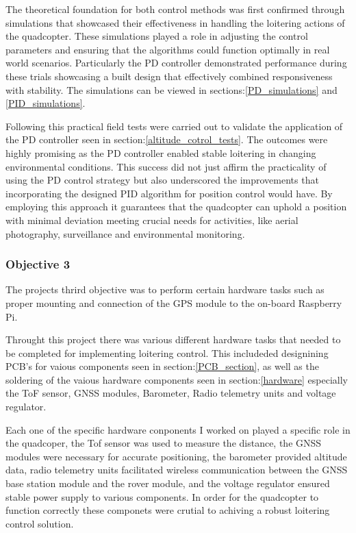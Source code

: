 \documentclass{article}
\begin{document}
The theoretical foundation for both control methods was first confirmed through
simulations that showcased their effectiveness in handling the loitering actions
of the quadcopter. These simulations played a role in adjusting the control
parameters and ensuring that the algorithms could function optimally in real
world scenarios. Particularly the PD controller demonstrated performance during
these trials showcasing a built design that effectively combined responsiveness
with stability. The simulations can be viewed in sections:\ref{PD_simulations}
and \ref{PID_simulations}.

Following this practical field tests were carried out to validate the
application of the PD controller seen in section:\ref{altitude_cotrol_tests}.
The outcomes were highly promising as the PD controller enabled stable loitering
in changing environmental conditions. This success did not just affirm the
practicality of using the PD control strategy but also underscored the
improvements that incorporating the designed PID algorithm for position control
would have. By employing this approach it guarantees that the quadcopter can
uphold a position with minimal deviation meeting crucial needs for activities,
like aerial photography, surveillance and environmental monitoring.

\subsubsection*{Objective 3}
The projects thrird objective was to perform certain hardware tasks such as
proper mounting and connection of the GPS module to the on-board Raspberry Pi.

Throught this project there was various different hardware tasks that needed to
be completed for implementing loitering control. This includeded designining
PCB's for vaious components seen in section:\ref{PCB_section}, as well as the
soldering of the vaious hardware components seen in section:\ref{hardware}
especially the ToF sensor, GNSS modules, Barometer, Radio telemetry units and
voltage regulator. 

Each one of the specific hardware conponents I worked on played a specific role
in the quadcoper, the Tof sensor was used to measure the distance, the GNSS
modules were necessary for accurate positioning, the barometer provided altitude
data, radio telemetry units facilitated wireless communication between the GNSS
base station module and the rover module, and the voltage regulator ensured
stable power supply to various components. In order for the quadcopter to
function correctly these componets were crutial to achiving a robust loitering
control solution.
\end{document}
